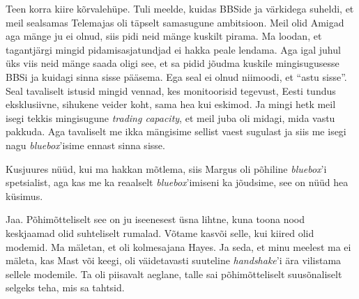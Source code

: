 Teen korra kiire kõrvalehüpe. Tuli meelde, kuidas BBSide ja värkidega suheldi, et meil sealsamas Telemajas oli täpselt samasugune ambitsioon. Meil olid Amigad aga mänge ju ei olnud, siis pidi neid mänge kuskilt pirama. Ma loodan, et tagantjärgi mingid pidamisasjatundjad ei hakka peale lendama. Aga igal juhul üks viis neid mänge saada oligi see, et sa pidid jõudma kuskile mingisugusesse BBSi ja kuidagi sinna sisse pääsema. Ega seal ei olnud niimoodi, et \enquote{astu sisse}. Seal tavaliselt istusid mingid vennad, kes monitoorisid tegevust,  Eesti tundus eksklusiivne, sihukene veider koht, sama hea kui eskimod. Ja mingi hetk meil isegi tekkis mingisugune \emph{trading capacity}, et meil juba oli midagi, mida  vastu pakkuda. Aga tavaliselt me ikka mängisime sellist vaest sugulast ja siis me isegi nagu \emph{bluebox}'isime ennast sinna sisse. 


Kusjuures nüüd, kui ma hakkan mõtlema, siis Margus oli põhiline \emph{bluebox}'i spetsialist, aga kas me ka reaalselt \emph{bluebox}'imiseni ka jõudsime, see on nüüd hea küsimus.


Jaa. Põhimõtteliselt see on ju iseenesest üsna lihtne, kuna toona nood keskjaamad olid suhteliselt rumalad.  Võtame kasvõi selle, kui kiired olid modemid. Ma mäletan, et oli kolmesajana Hayes. Ja seda, et minu meelest ma ei mäleta, kas Mast või keegi, oli väidetavasti suuteline \emph{handshake}'i ära vilistama sellele modemile. Ta  oli  piisavalt aeglane, talle sai põhimõtteliselt suusõnaliselt selgeks teha, mis sa tahtsid.

